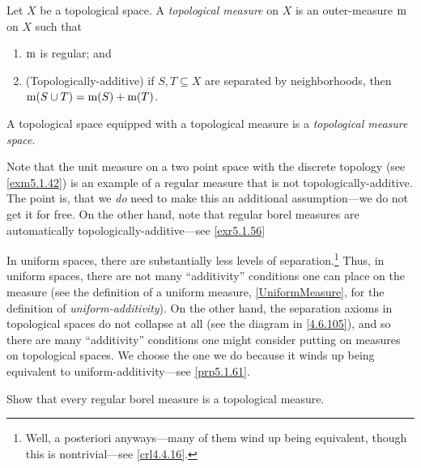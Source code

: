 \begin{dfn}\label{TopologicalMeasure}
Let $X$ be a topological space.  A \emph{topological measure} on $X$ is an outer-measure $\mathrm{m}$ on $X$ such that
\begin{enumerate}
\item $\mathrm{m}$ is regular; and
\item (Topologically-additive) if $S,T\subseteq X$ are separated by neighborhoods, then $\mathrm{m} (S\cup T)=\mathrm{m} (S)+\mathrm{m} (T)$.
\end{enumerate}
A topological space equipped with a topological measure is a \emph{topological measure space}.
\begin{rmk}
Note that the unit measure on a two point space with the discrete topology (see \cref{exm5.1.42}) is an example of a regular measure that is not topologically-additive.  The point is, that we \emph{do} need to make this an additional assumption---we do not get it for free.  On the other hand, note that regular borel measures are automatically topologically-additive---see \cref{exr5.1.56}
\end{rmk}
\begin{rmk}
In uniform spaces, there are substantially less levels of separation.\footnote{Well, a posteriori anyways---many of them wind up being equivalent, though this is nontrivial---see \cref{crl4.4.16}.}  Thus, in uniform spaces, there are not many ``additivity'' conditions one can place on the measure (see the definition of a uniform measure, \cref{UniformMeasure}, for the definition of \emph{uniform-additivity}).  On the other hand, the separation axioms in topological spaces do not collapse at all (see the diagram in \eqref{4.6.105}), and so there are many ``additivity'' conditions one might consider putting on measures on topological spaces.  We choose the one we do because it winds up being equivalent to uniform-additivity---see \cref{prp5.1.61}.
\end{rmk}
\end{dfn}
\begin{exr}\label{exr5.1.56}
Show that every regular borel measure is a topological measure.
\end{exr}
